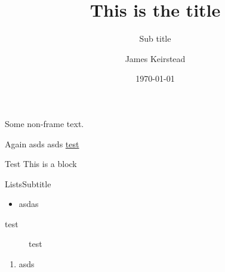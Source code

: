 
\title{This is the title}
\subtitle{Sub title}
\date{\today}
\author{James Keirstead}

\usepackage{lipsum}



\begin{frame}
\maketitle
\end{frame}

Some non-frame text.
\begin{frame}{Again}
asds \pause
asds \url{test}

\begin{block}{Test}
This is a block
\end{block}
\end{frame}

\begin{frame}{Lists}{Subtitle}
\begin{itemize}
\item asdas
\end{itemize}

\begin{description}
\item [test] test
\end{description}

\begin{enumerate}
\item asds
\end{enumerate}
\end{frame}


\lipsum[1-5]




